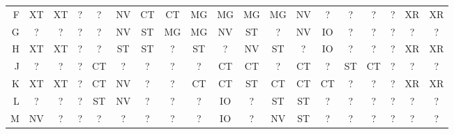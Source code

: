 \documentclass[10pt,a4paper]{article}
\begin{document}
\begin{landscape}
{\begin{tabular}{@{}r|*{18}{c}@{}}
F & \cellcolor{cltx}XT & \cellcolor{cltx}XT & \cellcolor{clun}? & \cellcolor{clun}? & \cellcolor{clnv}NV & \cellcolor{clct}CT & \cellcolor{clct}CT & \cellcolor{clmg}MG & \cellcolor{clmg}MG & \cellcolor{clmg}MG & \cellcolor{clmg}MG & \cellcolor{clnv}NV & \cellcolor{clun}? & \cellcolor{clun}? & \cellcolor{clun}? & \cellcolor{clun}? & \cellcolor{clrx}XR & \cellcolor{clrx}XR\\
G & \cellcolor{clun}? & \cellcolor{clun}? & \cellcolor{clun}? & \cellcolor{clun}? & \cellcolor{clnv}NV & \cellcolor{clst}ST & \cellcolor{clmg}MG & \cellcolor{clmg}MG & \cellcolor{clnv}NV & \cellcolor{clst}ST & \cellcolor{clun}? & \cellcolor{clnv}NV & \cellcolor{clio}IO & \cellcolor{clun}? & \cellcolor{clun}? & \cellcolor{clun}? & \cellcolor{clun}? & \cellcolor{clun}?\\
H & \cellcolor{cltx}XT & \cellcolor{cltx}XT & \cellcolor{clun}? & \cellcolor{clun}? & \cellcolor{clst}ST & \cellcolor{clst}ST & \cellcolor{clun}? & \cellcolor{clst}ST & \cellcolor{clun}? & \cellcolor{clnv}NV & \cellcolor{clst}ST & \cellcolor{clun}? & \cellcolor{clio}IO & \cellcolor{clun}? & \cellcolor{clun}? & \cellcolor{clun}? & \cellcolor{clrx}XR & \cellcolor{clrx}XR\\
J & \cellcolor{clun}? & \cellcolor{clun}? & \cellcolor{clun}? & \cellcolor{clct}CT & \cellcolor{clun}? & \cellcolor{clun}? & \cellcolor{clun}? & \cellcolor{clun}? & \cellcolor{clct}CT & \cellcolor{clct}CT & \cellcolor{clun}? & \cellcolor{clct}CT & \cellcolor{clun}? & \cellcolor{clst}ST & \cellcolor{clct}CT & \cellcolor{clun}? & \cellcolor{clun}? & \cellcolor{clun}?\\
K & \cellcolor{cltx}XT & \cellcolor{cltx}XT & \cellcolor{clun}? & \cellcolor{clct}CT & \cellcolor{clnv}NV & \cellcolor{clun}? & \cellcolor{clun}? & \cellcolor{clct}CT & \cellcolor{clct}CT & \cellcolor{clst}ST & \cellcolor{clct}CT & \cellcolor{clct}CT & \cellcolor{clct}CT & \cellcolor{clun}? & \cellcolor{clun}? & \cellcolor{clun}? & \cellcolor{clrx}XR & \cellcolor{clrx}XR\\
L & \cellcolor{clun}? & \cellcolor{clun}? & \cellcolor{clun}? & \cellcolor{clst}ST & \cellcolor{clnv}NV & \cellcolor{clun}? & \cellcolor{clun}? & \cellcolor{clun}? & \cellcolor{clio}IO & \cellcolor{clun}? & \cellcolor{clst}ST & \cellcolor{clst}ST & \cellcolor{clun}? & \cellcolor{clun}? & \cellcolor{clun}? & \cellcolor{clun}? & \cellcolor{clun}? & \cellcolor{clun}?\\
M & \cellcolor{clnv}NV & \cellcolor{clun}? & \cellcolor{clun}? & \cellcolor{clun}? & \cellcolor{clun}? & \cellcolor{clun}? & \cellcolor{clun}? & \cellcolor{clun}? & \cellcolor{clio}IO & \cellcolor{clun}? & \cellcolor{clnv}NV & \cellcolor{clst}ST & \cellcolor{clun}? & \cellcolor{clun}? & \cellcolor{clun}? & \cellcolor{clun}? & \cellcolor{clun}? & \cellcolor{clun}?\\

\end{tabular}}
\end{landscape}
\end{document}
